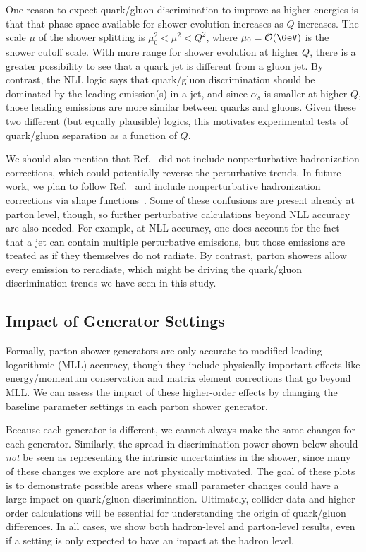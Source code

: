 \documentclass[11pt]{cernrep}
\begin{document}
One reason to expect quark/gluon discrimination to improve as higher energies is that that phase space available for shower evolution increases as $Q$ increases.  The scale $\mu$ of the shower splitting is $\mu_0^2 < \mu^2 < Q^2$, where $\mu_0 = \mathcal{O}(\GeV)$ is the shower cutoff scale.  With more range for shower evolution at higher $Q$, there is a greater possibility to see that a quark jet is different from a gluon jet.  By contrast, the NLL logic says that quark/gluon discrimination should be dominated by the leading emission(s) in a jet, and since $\alpha_s$ is smaller at higher $Q$, those leading emissions are more similar between quarks and gluons.  Given these two different (but equally plausible) logics, this motivates experimental tests of quark/gluon separation as a function of $Q$.

We should also mention that Ref.~\cite{Larkoski:2013eya} did not include nonperturbative hadronization corrections, which could potentially reverse the perturbative trends.  In future work, we plan to follow Ref.~\cite{Larkoski:2013paa} and include nonperturbative hadronization corrections via shape functions~\cite{Manohar:1994kq, Dokshitzer:1995zt, Korchemsky:1999kt, Korchemsky:2000kp, Salam:2001bd, Lee:2006nr, Mateu:2012nk}.  Some of these confusions are present already at parton level, though, so further perturbative calculations beyond NLL accuracy are also needed.  For example, at NLL accuracy, one does account for the fact that a jet can contain multiple perturbative emissions, but those emissions are treated as if they themselves do not radiate.  By contrast, parton showers allow every emission to reradiate, which might be driving the quark/gluon discrimination trends we have seen in this study.




\subsection{Impact of Generator Settings}
\label{quarkgluon_sec:ee_settings}

Formally, parton shower generators are only accurate to modified leading-logarithmic (MLL) accuracy, though they include physically important effects like energy/momentum conservation and matrix element corrections that go beyond MLL.  We can assess the impact of these higher-order effects by changing the baseline parameter settings in each parton shower generator.  

Because each generator is different, we cannot always make the same changes for each generator.  Similarly, the spread in discrimination power shown below should \emph{not} be seen as representing the intrinsic uncertainties in the shower, since many of these changes we explore are not physically motivated.  The goal of these plots is to demonstrate possible areas where small parameter changes could have a large impact on quark/gluon discrimination.  Ultimately, collider data and higher-order calculations will be essential for understanding the origin of quark/gluon differences.  In all cases, we show both hadron-level and parton-level results, even if a setting is only expected to have an impact at the hadron level.  
\end{document}

